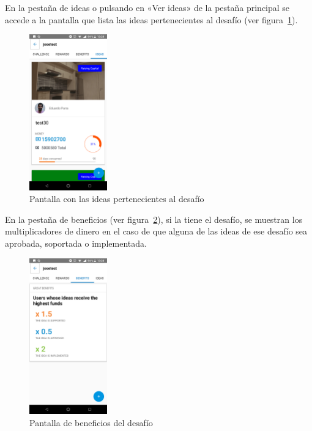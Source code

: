 En la pestaña de ideas o pulsando en «Ver ideas» de la pestaña principal se accede a la 
pantalla que lista las ideas pertenecientes al desafío (ver figura~\ref{fig:ver_desafio_ideas}).
\begin{figure}[!h]
	\begin{center}
		\includegraphics[width=0.3\textwidth]{./img/anexo1/ver_desafio_ideas.png}
		\caption{Pantalla con las ideas pertenecientes al desafío}
		\label{fig:ver_desafio_ideas}
	\end{center}
\end{figure}

En la pestaña de beneficios (ver figura~\ref{fig:ver_desafio_beneficios}), si la tiene el desafío, 
se muestran los multiplicadores de dinero en el caso de que alguna de las ideas de ese 
desafío sea aprobada, soportada o implementada.

\begin{figure}[!h]
	\begin{center}
		\includegraphics[width=0.3\textwidth]{./img/anexo1/ver_desafio_beneficios.png}
		\caption{Pantalla de beneficios del desafío}
		\label{fig:ver_desafio_beneficios}
	\end{center}
\end{figure}


